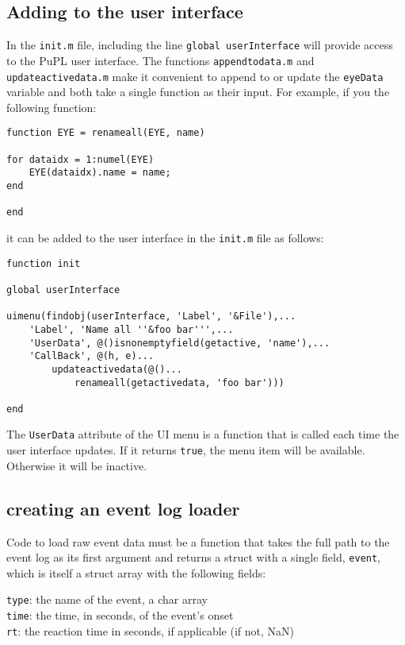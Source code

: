 \documentclass{article}
\begin{document}
\subsection{Adding to the user interface}
In the \texttt{init.m} file, including the line \texttt{global userInterface} will provide access to the PuPL user interface. The functions \texttt{appendtodata.m} and \texttt{updateactivedata.m} make it convenient to append to or update the \texttt{eyeData} variable and both take a single function as their input. For example, if you the following function:
\begin{verbatim}
function EYE = renameall(EYE, name)

for dataidx = 1:numel(EYE)
    EYE(dataidx).name = name;
end

end
\end{verbatim}
it can be added to the user interface in the \texttt{init.m} file as follows:
\begin{verbatim}
function init

global userInterface

uimenu(findobj(userInterface, 'Label', '&File'),...
    'Label', 'Name all ''&foo bar''',...
    'UserData', @()isnonemptyfield(getactive, 'name'),...
    'CallBack', @(h, e)...
        updateactivedata(@()...
            renameall(getactivedata, 'foo bar')))

end
\end{verbatim}
The \texttt{UserData} attribute of the UI menu is a function that is called each time the user interface updates. If it returns \texttt{true}, the menu item will be available. Otherwise it will be inactive.
\subsection{creating an event log loader} \label{event_log_loader}
Code to load raw event data must be a function that takes the full path to the event log as its first argument and returns a struct with a single field, \texttt{event}, which is itself a struct array with the following fields:
\begin{addmargin}[1em]{0em}
\texttt{type}: the name of the event, a char array\\
\texttt{time}: the time, in seconds, of the event's onset\\
\texttt{rt}: the reaction time in seconds, if applicable (if not, NaN)
\end{addmargin}
\end{document}
